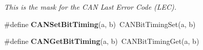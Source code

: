 \begin{DoxyCompactItemize}
\begin{DoxyCompactList}\small\item\em This is the mask for the C\+AN Last Error Code (L\+EC). \end{DoxyCompactList}\item 
\#define {\bfseries C\+A\+N\+Set\+Bit\+Timing}(a,  b)~C\+A\+N\+Bit\+Timing\+Set(a, b)\hypertarget{group__can__api_ga08204cc7ba65ec3fd720e47fadd60559}{}\label{group__can__api_ga08204cc7ba65ec3fd720e47fadd60559}

\item 
\#define {\bfseries C\+A\+N\+Get\+Bit\+Timing}(a,  b)~C\+A\+N\+Bit\+Timing\+Get(a, b)\hypertarget{group__can__api_ga449194e3e6419c901d077ccbe0021aec}{}\label{group__can__api_ga449194e3e6419c901d077ccbe0021aec}

\end{DoxyCompactItemize}
